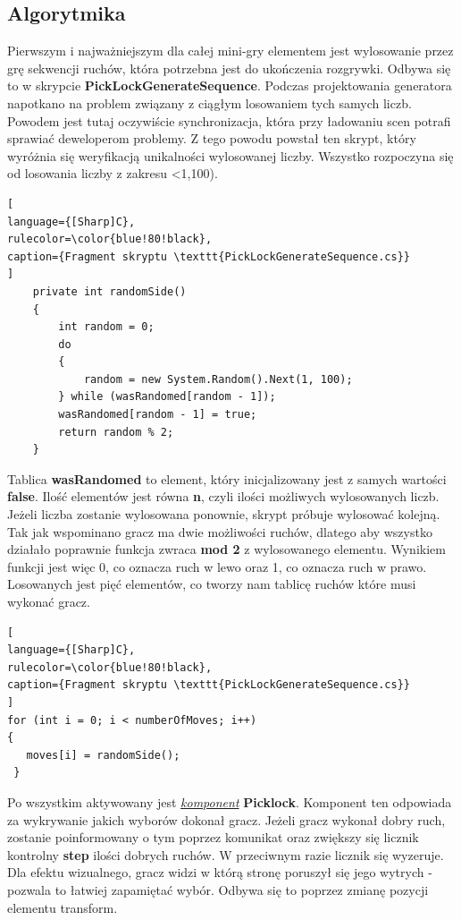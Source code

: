 \documentclass[oneside,polski,logo]{amuthesis}
\begin{document}
\subsection{Algorytmika}
\par Pierwszym i najważniejszym dla całej mini-gry elementem jest wylosowanie przez grę sekwencji ruchów, która potrzebna jest do ukończenia rozgrywki. Odbywa się to w skrypcie \textbf{PickLockGenerateSequence}. Podczas projektowania generatora napotkano na problem związany z ciągłym losowaniem tych samych liczb. Powodem jest tutaj oczywiście synchronizacja, która przy ładowaniu scen potrafi sprawiać deweloperom problemy. Z tego powodu powstał ten skrypt, który wyróżnia się weryfikacją unikalności wylosowanej liczby.
Wszystko rozpoczyna się od losowania liczby z zakresu <1,100).
\begin{lstlisting}[
language={[Sharp]C},
rulecolor=\color{blue!80!black},
caption={Fragment skryptu \texttt{PickLockGenerateSequence.cs}}
]
    private int randomSide()
    {
        int random = 0;
        do
        {
            random = new System.Random().Next(1, 100);
        } while (wasRandomed[random - 1]);
        wasRandomed[random - 1] = true;
        return random % 2;
    }
\end{lstlisting}
Tablica \textbf{wasRandomed} to element, który inicjalizowany jest z samych wartości \textbf{false}. Ilość elementów jest równa \textbf{n}, czyli ilości możliwych wylosowanych liczb. Jeżeli liczba zostanie wylosowana ponownie, skrypt próbuje wylosować kolejną. Tak jak wspominano gracz ma dwie możliwości ruchów, dlatego aby wszystko działało poprawnie funkcja zwraca \textbf{mod 2} z wylosowanego elementu. Wynikiem funkcji jest więc 0, co oznacza ruch w lewo oraz 1, co oznacza ruch w prawo. Losowanych jest pięć elementów, co tworzy nam tablicę ruchów które musi wykonać gracz.
\begin{lstlisting}[
language={[Sharp]C},
rulecolor=\color{blue!80!black},
caption={Fragment skryptu \texttt{PickLockGenerateSequence.cs}}
]
for (int i = 0; i < numberOfMoves; i++)
{
   moves[i] = randomSide();
 }
\end{lstlisting}
Po wszystkim aktywowany jest \hyperref[sec:komponent]{\emph{komponent}} \textbf{Picklock}. Komponent ten odpowiada za wykrywanie jakich wyborów dokonał gracz. Jeżeli gracz wykonał dobry ruch, zostanie poinformowany o tym poprzez komunikat oraz zwiększy się licznik kontrolny \textbf{step} ilości dobrych ruchów. W przeciwnym razie licznik się wyzeruje. Dla efektu wizualnego, gracz widzi w którą stronę poruszył się jego wytrych - pozwala to łatwiej zapamiętać wybór. Odbywa się to poprzez zmianę pozycji elementu transform.
\end{document}
